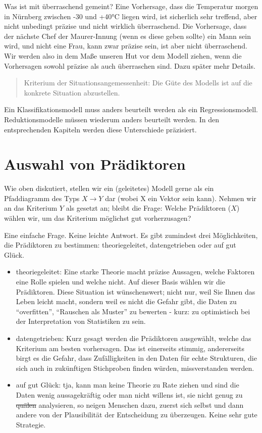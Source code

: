 \documentclass[12pt,ngerman,]{book}
\begin{document}
Was ist mit überraschend gemeint? Eine Vorhersage, dass die Temperatur
morgen in Nürnberg zwischen -30 und +40°C liegen wird, ist sicherlich
sehr treffend, aber nicht unbedingt präzise und nicht wirklich
überraschend. Die Vorhersage, dass der nächste Chef der Maurer-Innung
(wenn es diese geben sollte) ein Mann sein wird, und nicht eine Frau,
kann zwar präzise sein, ist aber nicht überraschend. Wir werden also in
dem Maße unseren Hut vor dem Modell ziehen, wenn die Vorhersagen sowohl
präzise als auch überraschen sind. Dazu später mehr Details.

\begin{quote}
Kriterium der Situationsangemessenheit: Die Güte des Modells ist auf die
konkrete Situation abzustellen.
\end{quote}

Ein Klassifikationsmodell muss anders beurteilt werden als ein
Regressionsmodell. Reduktionsmodelle müssen wiederum anders beurteilt
werden. In den entsprechenden Kapiteln werden diese Unterschiede
präzisiert.

\section{Auswahl von Prädiktoren}\label{auswahl-von-pradiktoren}

Wie oben diskutiert, stellen wir ein (geleitetes) Modell gerne als ein
Pfaddiagramm des Typs \(X \rightarrow Y\) dar (wobei X ein Vektor sein
kann). Nehmen wir an das Kriterium \(Y\) als gesetzt an; bleibt die
Frage: Welche Prädiktoren (\(X\)) wählen wir, um das Kriterium möglichst
gut vorherzusagen?

Eine einfache Frage. Keine leichte Antwort. Es gibt zumindest drei
Möglichkeiten, die Prädiktoren zu bestimmen: theoriegeleitet,
datengetrieben oder auf gut Glück.

\begin{itemize}
\item
  theoriegeleitet: Eine starke Theorie macht präzise Aussagen, welche
  Faktoren eine Rolle spielen und welche nicht. Auf dieser Basis wählen
  wir die Prädiktoren. Diese Situation ist wünschenswert; nicht nur,
  weil Sie Ihnen das Leben leicht macht, sondern weil es nicht die
  Gefahr gibt, die Daten zu ``overfitten'', ``Rauschen als Muster'' zu
  bewerten - kurz: zu optimistisch bei der Interpretation von
  Statistiken zu sein.
\item
  datengetrieben: Kurz gesagt werden die Prädiktoren ausgewählt, welche
  das Kriterium am besten vorhersagen. Das ist einerseits stimmig,
  andererseits birgt es die Gefahr, dass Zufälligkeiten in den Daten für
  echte Strukturen, die sich auch in zukünftigen Stichproben finden
  würden, missverstanden werden.
\item
  auf gut Glück: tja, kann man keine Theorie zu Rate ziehen und sind die
  Daten wenig aussagekräftig oder man nicht willens ist, sie nicht genug
  zu \sout{quälen} analysieren, so neigen Menschen dazu, zuerst sich
  selbst und dann andere von der Plausibilität der Entscheidung zu
  überzeugen. Keine sehr gute Strategie.
\end{itemize}
\end{document}
